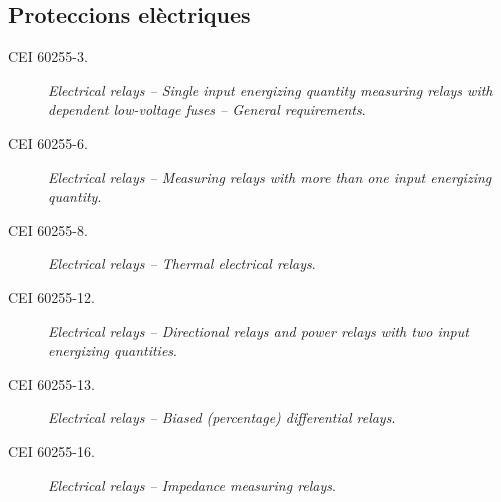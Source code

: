 \subsection*{Proteccions elèctriques}
\begin{description}
    \item [\hspace{5mm}CEI 60255-3.] \textit{Electrical relays -- Single input energizing quantity measuring relays with dependent low-voltage fuses -- General requirements}.
    \item [\hspace{5mm}CEI 60255-6.] \textit{Electrical relays -- Measuring relays with more than one input energizing quantity}.
    \item [\hspace{5mm}CEI 60255-8.] \textit{Electrical relays -- Thermal electrical relays}.
    \item [\hspace{5mm}CEI 60255-12.] \textit{Electrical relays -- Directional relays and power relays with two input energizing quantities}.
    \item [\hspace{5mm}CEI 60255-13.] \textit{Electrical relays -- Biased (percentage) differential relays}.
    \item [\hspace{5mm}CEI 60255-16.] \textit{Electrical relays -- Impedance measuring relays}.
\end{description}

